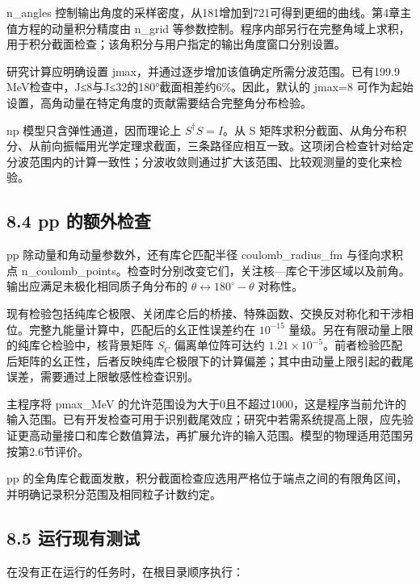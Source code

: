 \documentclass[UTF8,a4paper,zihao=5,fontset=fandol]{ctexart}
\begin{document}
{\ttfamily\small n\_\allowbreak{}angles} 控制输出角度的采样密度，从181增加到721可得到更细的曲线。第4章主值方程的动量积分精度由 {\ttfamily\small n\_\allowbreak{}grid} 等参数控制。程序内部另行在完整角域上求积，用于积分截面检查；该角积分与用户指定的输出角度窗口分别设置。

研究计算应明确设置 {\ttfamily\small jmax}，并通过逐步增加该值确定所需分波范围。已有199.9 MeV检查中，J≤8与J≤32的180°截面相差约6\%。因此，默认的 {\ttfamily\small jmax=\allowbreak{}8} 可作为起始设置，高角动量在特定角度的贡献需要结合完整角分布检验。

np 模型只含弹性通道，因而理论上 \(S^\dagger S=I\)。从 S 矩阵求积分截面、从角分布积分、从前向振幅用光学定理求截面，三条路径应相互一致。这项闭合检查针对给定分波范围内的计算一致性；分波收敛则通过扩大该范围、比较观测量的变化来检验。

\subsection*{8.4 pp 的额外检查}
pp 除动量和角动量参数外，还有库仑匹配半径 {\ttfamily\small coulomb\_\allowbreak{}radius\_\allowbreak{}fm} 与径向求积点 {\ttfamily\small n\_\allowbreak{}coulomb\_\allowbreak{}points}。检查时分别改变它们，关注核—库仑干涉区域以及前角。输出应满足未极化相同质子角分布的 \(\theta\leftrightarrow180^\circ-\theta\) 对称性。

现有检验包括纯库仑极限、关闭库仑后的桥接、特殊函数、交换反对称化和干涉相位。完整九能量计算中，匹配后的幺正性误差约在 \(10^{-15}\) 量级。另在有限动量上限的纯库仑检验中，核背景矩阵 \(S_C\) 偏离单位阵可达约 \(1.21\times10^{-5}\)。前者检验匹配后矩阵的幺正性，后者反映纯库仑极限下的计算偏差；其中由动量上限引起的截尾误差，需要通过上限敏感性检查识别。

主程序将 {\ttfamily\small pmax\_\allowbreak{}MeV} 的允许范围设为大于0且不超过1000，这是程序当前允许的输入范围。已有开发检查可用于识别截尾效应；研究中若需系统提高上限，应先验证更高动量接口和库仑数值算法，再扩展允许的输入范围。模型的物理适用范围另按第2.6节评价。

pp 的全角库仑截面发散，积分截面检查应选用严格位于端点之间的有限角区间，并明确记录积分范围及相同粒子计数约定。

\subsection*{8.5 运行现有测试}
在没有正在运行的任务时，在根目录顺序执行：
\end{document}
